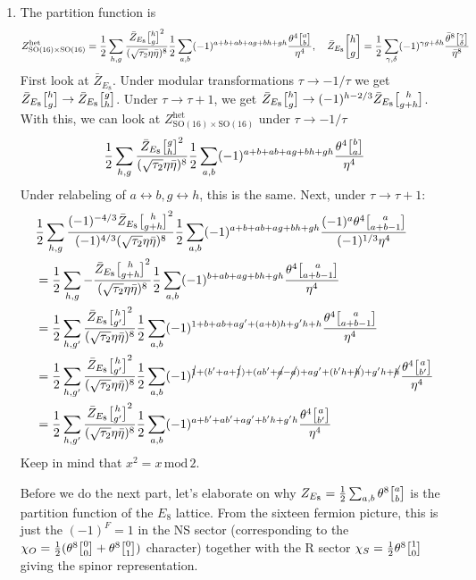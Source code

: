 \documentclass[11pt, class=article, crop=false]{standalone}
\begin{document}
\begin{enumerate}
	\item The partition function is
	\[
		Z_{\mathrm{SO}(16) \times \mathrm{SO}(16)}^{\mathrm{het}} 
		= \frac12 \sum_{h,g} \frac{\bar Z_{E_8}\twist hg ^2}{(\sqrt{\tau_2} \eta \bar \eta)^8} \frac12 \sum_{a,b} (-1)^{a+b+ab+ ag+bh+gh} \frac{\theta^4 \twist ab}{\eta^4}, 
		\quad \bar Z_{E_8}\twist hg = \frac12 \sum_{\gamma, \delta} (-1)^{\gamma g + \delta h} \frac{\bar \theta^8 \twist \gamma \delta}{\bar \eta^8}
	\]
	First look at $\bar Z_{E_8}$. Under modular transformations $\tau \to -1/\tau$ we get $\bar Z_{E_8}\twist hg \to \bar Z_{E_8} \twist gh$. Under $\tau \to \tau + 1$, we get $\bar Z_{E_8}\twist hg \to (-1)^{h-2/3} \bar Z_{E_8}\twist{h}{g+h}$. With this, we can look at $Z_{\mathrm{SO}(16) \times \mathrm{SO}(16)}^{\mathrm{het}}$ under $\tau \to -1/\tau$
	\[
		\frac12 \sum_{h,g} \frac{\bar Z_{E_8}\twist gh ^2}{(\sqrt{\tau_2} \eta \bar \eta)^8} \frac12 \sum_{a,b} (-1)^{a+b+ab+ ag+bh+gh} \frac{\theta^4 \twist ba}{\eta^4}
	\]
	Under relabeling of $a\leftrightarrow b, g\leftrightarrow h$, this is the same. Next, under $\tau \to \tau+1$:
	\[
	\begin{aligned}
		&\frac12 \sum_{h,g} \frac{(-1)^{-4/3} \bar Z_{E_8}\twist{h}{g+h}^2}{(-1)^{4/3} (\sqrt{\tau_2} \eta \bar \eta)^8} \frac12 \sum_{a,b} (-1)^{a+b+ab+ ag+bh+gh} \frac{(-1)^a \theta^4 \twist{a}{a+b-1}}{(-1)^{1/3} \eta^4}\\ 
		&= \frac12 \sum_{h,g} - \frac{ \bar Z_{E_8}\twist{h}{g+h}^2}{(\sqrt{\tau_2} \eta \bar \eta)^8} \frac12 \sum_{a,b} (-1)^{b+ab+ ag+bh+gh} \frac{\theta^4 \twist{a}{a+b-1}}{\eta^4}\\
		&=	\frac12 \sum_{h,g'} \frac{ \bar Z_{E_8}\twist{h}{g'}^2}{(\sqrt{\tau_2} \eta \bar \eta)^8} \frac12 \sum_{a,b} (-1)^{1+b+ab+ ag' + (a+b) h +g'h + h} \frac{\theta^4 \twist{a}{a+b-1}}{\eta^4}\\
		&= \frac12 \sum_{h,g'} \frac{ \bar Z_{E_8}\twist{h}{g'}^2}{(\sqrt{\tau_2} \eta \bar \eta)^8} \frac12 \sum_{a,b} (-1)^{\cancel 1 + (b' + a + \cancel 1) + (ab' + \cancel a - \cancel a) + ag' + (b' h + \cancel{h}) +g'h + \cancel h } \frac{\theta^4 \twist{a}{b'}}{\eta^4}\\
		&= \frac12 \sum_{h,g'} \frac{ \bar Z_{E_8}\twist{h}{g'}^2}{(\sqrt{\tau_2} \eta \bar \eta)^8} \frac12 \sum_{a,b} (-1)^{a + b' + a b' + a g' + b' h + g' h} \frac{\theta^4 \twist{a}{b'}}{\eta^4}\\
	\end{aligned}
	\]
	Keep in mind that $x^2 = x\, \mathrm{mod}\, 2$. 
	
	Before we do the next part, let's elaborate on why $Z_{E_8} = \frac12 \sum_{a, b} \theta^8 \twist ab$ is the partition function of the $E_8$ lattice. From the sixteen fermion picture, this is just the $(-1)^F = 1$ in the NS sector (corresponding to the $\chi_O = \frac12 (\theta^8 \twist00 + \theta^8 \twist01)$ character) together with the R sector $\chi_S = \frac12 \theta^8 \twist10$ giving the spinor representation.
	 

\end{enumerate}
\end{document}
